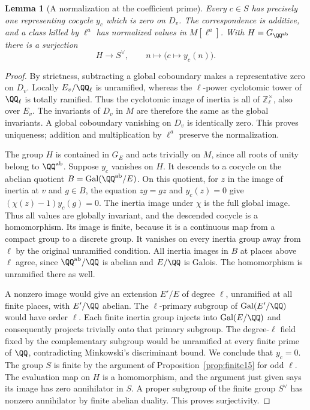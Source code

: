 \documentclass[a4paper,11pt]{article}
\newtheorem{lemma}[proposition]{Lemma}
\theoremstyle{definition}
\theoremstyle{remark}
\newcommand{\ZZ}{\mathbb Z}\newcommand{\ord}{\operatorname{ord}}
\numberwithin{equation}{section}
\begin{document}
\begin{lemma}[A normalization at the coefficient prime]
\leavevmode\label{lem:normalizedstrict600}
Every \(c\in S\) has precisely one representing cocycle
\(y_c\) which is zero on \(D_v\). The correspondence is
additive, and a class killed by \(\ell^a\) has normalized
values in \(M[\ell^a]\). With \(H=G_{\QQ^{\rm ab}}\)
there is a surjection
\[
    H\longrightarrow S^\vee,\qquad
           n\longmapsto\bigl(c\longmapsto y_c(n)\bigr).
\]
\end{lemma}
\begin{proof}
By strictness, subtracting a global coboundary makes a
representative zero on \(D_v\). Locally \(E_v/\QQ_\ell\)
is unramified, whereas the \(\ell\)-power cyclotomic tower
of \(\QQ_\ell\) is totally ramified. Thus the cyclotomic
image of inertia is all of \(\ZZ_\ell^\times\), also
over \(E_v\). The invariants of \(D_v\) in \(M\) are
therefore the same as the global invariants. A global
coboundary vanishing on \(D_v\) is identically zero.
This proves uniqueness; addition and multiplication by
\(\ell^a\) preserve the normalization.

The group \(H\) is contained in \(G_E\) and acts
trivially on \(M\), since all roots of unity belong to
\(\QQ^{\rm ab}\). Suppose \(y_c\) vanishes on \(H\).
It descends to a cocycle on the abelian quotient
\(B=\operatorname{Gal}(\QQ^{\rm ab}/E)\). On this
quotient, for \(z\) in the image of inertia at \(v\)
and \(g\in B\), the equation \(zg=gz\) and \(y_c(z)=0\)
give \((\chi(z)-1)y_c(g)=0\). The inertia image under
\(\chi\) is the full global image. Thus all values are
globally invariant, and the descended cocycle is a
homomorphism. Its image is finite, because it is a
continuous map from a compact group to a discrete group.
It vanishes on every inertia group away from \(\ell\)
by the original unramified condition. All inertia images
in \(B\) at places above \(\ell\) agree, since
\(\QQ^{\rm ab}/\QQ\) is abelian and \(E/\QQ\) is Galois.
The homomorphism is unramified there as well.

A nonzero image would give an extension \(E'/E\) of
degree \(\ell\), unramified at all finite places, with
\(E'/\QQ\) abelian. The \(\ell\)-primary subgroup of
\(\operatorname{Gal}(E'/\QQ)\) would have order \(\ell\).
Each finite inertia group injects into
\(\operatorname{Gal}(E/\QQ)\) and consequently projects
trivially onto that primary subgroup. The degree-\(\ell\)
field fixed by the complementary subgroup would be
unramified at every finite prime of \(\QQ\), contradicting
Minkowski's discriminant bound. We conclude that
\(y_c=0\). The group \(S\) is finite by the argument of
Proposition~\ref{prop:finite15} for odd \(\ell\).
The evaluation map on \(H\) is a homomorphism, and the
argument just given says its image has zero annihilator
in \(S\). A proper subgroup of the finite group \(S^\vee\)
has nonzero annihilator by finite abelian duality.
This proves surjectivity.
\end{proof}
\end{document}
